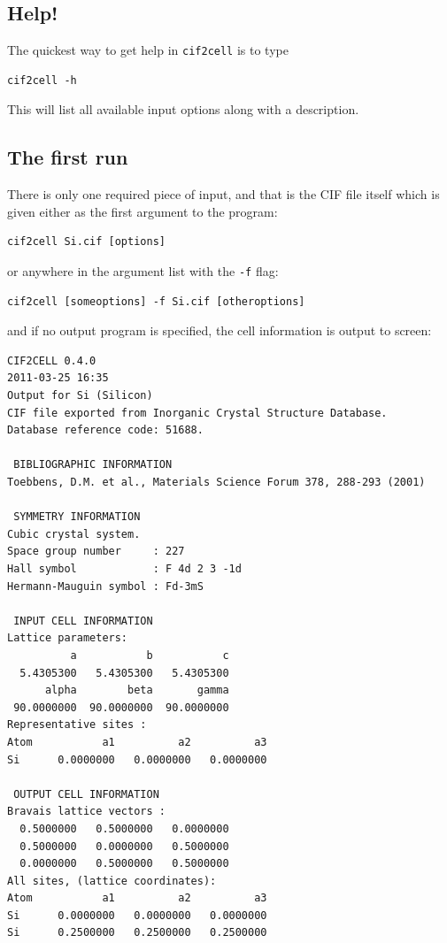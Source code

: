 \documentclass[11pt]{article}
\newcommand{\ciftocell}{\texttt{cif2cell}}
\begin{document}
\subsection{Help!}
The quickest way to get help in \ciftocell{} is to type
\begin{verbatim}
cif2cell -h
\end{verbatim}
This will list all available input options along with a description.

\subsection{The first run}\label{firstrun}
There is only one required piece of input, and that is the CIF file itself which is given either as the first argument to the program:
\begin{verbatim}
cif2cell Si.cif [options]
\end{verbatim}
or anywhere in the argument list with the \texttt{-f} flag:
\begin{verbatim}
cif2cell [someoptions] -f Si.cif [otheroptions]
\end{verbatim}
and if no output program is specified, the cell information is output to screen:

\begin{verbatim}
CIF2CELL 0.4.0
2011-03-25 16:35
Output for Si (Silicon)
CIF file exported from Inorganic Crystal Structure Database.
Database reference code: 51688.

 BIBLIOGRAPHIC INFORMATION
Toebbens, D.M. et al., Materials Science Forum 378, 288-293 (2001) 

 SYMMETRY INFORMATION
Cubic crystal system.
Space group number     : 227
Hall symbol            : F 4d 2 3 -1d
Hermann-Mauguin symbol : Fd-3mS

 INPUT CELL INFORMATION
Lattice parameters:
          a           b           c 
  5.4305300   5.4305300   5.4305300 
      alpha        beta       gamma 
 90.0000000  90.0000000  90.0000000 
Representative sites :
Atom           a1          a2          a3 
Si      0.0000000   0.0000000   0.0000000

 OUTPUT CELL INFORMATION
Bravais lattice vectors :
  0.5000000   0.5000000   0.0000000 
  0.5000000   0.0000000   0.5000000 
  0.0000000   0.5000000   0.5000000 
All sites, (lattice coordinates):
Atom           a1          a2          a3 
Si      0.0000000   0.0000000   0.0000000
Si      0.2500000   0.2500000   0.2500000
\end{verbatim}
\end{document}
